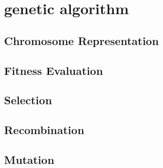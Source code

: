 \section{genetic algorithm}
\label{sec:genetic_algorithm}

\subsection{Chromosome Representation}
\subsection{Fitness Evaluation}
\subsection{Selection}
\subsection{Recombination}
\subsection{Mutation}

